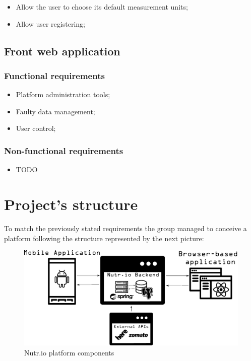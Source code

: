 \begin{itemize}
    \item Allow the user to choose its default measurement units;
    \item Allow user registering;
\end{itemize}

\subsection{Front web application}

\subsubsection{Functional requirements}

\begin{itemize}
    \item Platform administration tools;
    \item Faulty data management;
    \item User control;
\end{itemize}

\subsubsection{Non-functional requirements}

\begin{itemize}
    \item TODO
\end{itemize}

\section{Project's structure}

To match the previously stated requirements the group managed to conceive a platform following the structure
represented by the next picture:\\

\begin{figure}[H]
    \begin{center}
        \includegraphics[scale=0.4]{_figures/Nutrio_components.eps}
        \caption{Nutr.io platform components}
    \end{center}
\end{figure}

